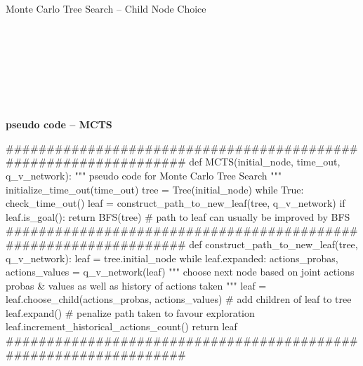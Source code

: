 \teal
\begin{algorithm}[H]
\caption{Monte Carlo Tree Search -- Child Node Choice}\label{alg:TheoryDQLNodeChoice}
\begin{algorithmic}


\\ \black


\\ \black
{}
\\ \black
\\ \black
{}
\\
\EndFunction
\end{algorithmic}
\end{algorithm}
\black






\teal
\paragraph{}{\textbf{pseudo code -- \textbf{MCTS}}}
\begin{pseudocode}
#################################################################
def MCTS(initial_node, time_out, q_v_network):
    """ pseudo code for Monte Carlo Tree Search """
    initialize_time_out(time_out)
    tree = Tree(initial_node)
    while True:
        check_time_out()
        leaf = construct_path_to_new_leaf(tree, q_v_network)
        if leaf.is_goal():
            return BFS(tree) # path to leaf can usually be improved by BFS
#################################################################
def construct_path_to_new_leaf(tree, q_v_network):
    leaf = tree.initial_node
    while leaf.expanded:
        actions_probas, actions_values = q_v_network(leaf)
        """ choose next node based on joint actions probas & values
        as well as history of actions taken
        """
        leaf = leaf.choose_child(actions_probas,
                                 actions_values)
    # add children of leaf to tree
    leaf.expand()
    # penalize path taken to favour exploration
    leaf.increment_historical_actions_count()
    return leaf
#################################################################
\end{pseudocode}
\black

